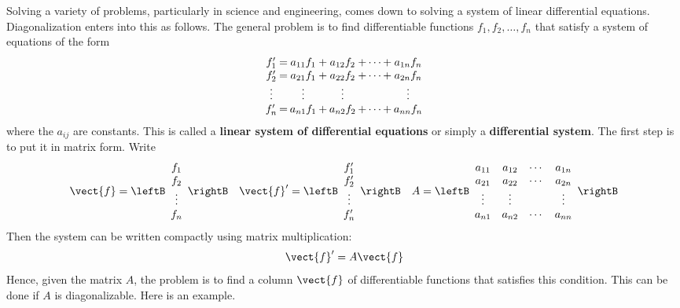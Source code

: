 Solving a variety of problems, 
particularly in science and engineering, comes down to solving a system 
of linear differential equations. Diagonalization enters into this as 
follows. The general problem is to find differentiable functions $f_{1}, f_{2}, \dots , f_{n}$ that satisfy a system of equations of the form
\begin{equation*}
\arraycolsep=1pt
\begin{array}{ccccccc}
f_1^{\prime} & = & a_{11}f_1 &+& a_{12}f_2 & + \cdots + & a_{1n}f_n \\
f_2^{\prime} & = & a_{21}f_1 &+& a_{22}f_2 & + \cdots + & a_{2n}f_n \\
\vdots & & \vdots & & \vdots & & \vdots \\
f_n^{\prime} & = & a_{n1}f_1 &+& a_{n2}f_2 & + \cdots + & a_{nn}f_n \\
\end{array}
\end{equation*}
where the $a_{ij}$ are constants. This is called a \textbf{linear system of differential equations} or simply a \textbf{differential system}. The first step is to put it in matrix form. Write
\begin{equation*}
\vect{f} = \leftB \begin{array}{c}
f_1 \\
f_2 \\
\vdots \\
f_n 
\end{array}\rightB \quad  \vect{f}^{\prime} = \leftB \begin{array}{c}
f_1^{\prime} \\
f_2^{\prime} \\
\vdots \\
f_n ^{\prime}
\end{array}\rightB \quad A = \leftB \begin{array}{cccc}
a_{11} & a_{12} & \cdots & a_{1n} \\
a_{21} & a_{22} & \cdots & a_{2n} \\
\vdots & \vdots & & \vdots \\
a_{n1} & a_{n2} & \cdots & a_{nn} 
\end{array}\rightB
\end{equation*}
Then the system can be written compactly using matrix multiplication:
\begin{equation*}
\vect{f}^{\prime} = A \vect{f}
\end{equation*}
Hence, given the matrix $A$, the problem is to find a column $\vect{f}$ of differentiable functions that satisfies this condition. This can be done if $A$ is diagonalizable. Here is an example.


